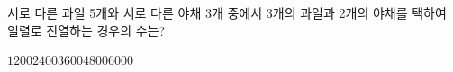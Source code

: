 \hspace*{2mm}\begin{minipage}[t]{\dimexpr\linewidth-2mm\relax}\vspace{0pt}
서로 다른 과일 5개와 서로 다른 야채 3개 중에서 3개의 과일과 2개의 야채를 택하여 일렬로 진열하는 경우의 수는?
\begin{choices32}{$1200$}{$2400$}{$3600$}{$4800$}{$6000$}\end{choices32}\end{minipage}
